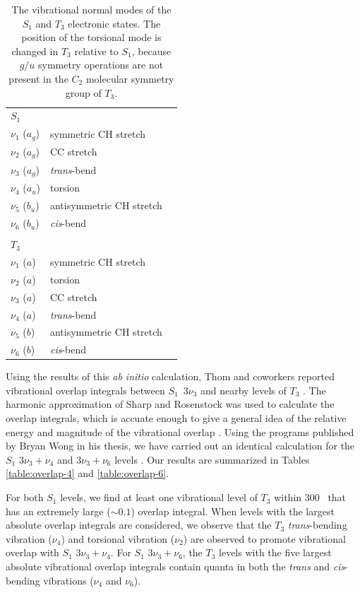 \documentclass[12pt]{mitthesis}
\begin{document}
\begin{table}
  \caption{The vibrational normal modes of the $S_1$ and $T_3$
    electronic states. The
    position of the torsional mode is changed in $T_3$ relative to
    $S_1$, because $g/u$ symmetry operations are not present in the 
    $C_2$ molecular symmetry group of $T_3$.
  }
  \label{table:vibration-ids}
  \centering
  \vspace{5mm}
  \begin{tabular}{llc}
    \toprule
    $S_1$\\
    $\nu_1$ ($a_g$) & symmetric CH stretch \\
    $\nu_2$ ($a_g$) & CC stretch \\
    $\nu_3$ ($a_g$) & \emph{trans}-bend \\
    $\nu_4$ ($a_u$) & torsion \\
    $\nu_5$ ($b_u$) & antisymmetric CH stretch \\
    $\nu_6$ ($b_u$) & \emph{cis}-bend \\
    \\
    $T_3$\\
    $\nu_1$ ($a$) & symmetric CH stretch \\
    $\nu_2$ ($a$) & torsion \\
    $\nu_3$ ($a$) & CC stretch \\
    $\nu_4$ ($a$) & \emph{trans}-bend \\
    $\nu_5$ ($b$) & antisymmetric CH stretch \\
    $\nu_6$ ($b$) & \emph{cis}-bend \\
    \bottomrule
  \end{tabular}
\end{table}

Using the results of this \emph{ab initio} calculation, Thom and
coworkers reported vibrational overlap integrals between $S_1 \:\;
3\nu_3$ and nearby levels of $T_3$ \cite{thom07}.  The harmonic
approximation of Sharp and Rosenstock was used to calculate the
overlap integrals, which is accuate enough to give a general idea of
the relative energy and magnitude of the vibrational overlap
\cite{sharp64}.  Using the programs published by Bryan Wong in his
thesis, we have carried out an identical calculation for the $S_1$
$3\nu_3+\nu_4$ and $3\nu_3+\nu_6$ levels \cite{wong07}.  Our results
are summarized in Tables \ref{table:overlap-4} and
\ref{table:overlap-6}.

For both $S_1$ levels, we find at least one vibrational level of $T_3$
within 300 \rcm\ that has an extremely large ($\sim 0.1$) overlap
integral.  When levels with the largest absolute overlap integrals
are considered, we observe that the $T_3$ \emph{trans}-bending
vibration ($\nu_4$) and torsional vibration ($\nu_2$) are observed to
promote vibrational overlap with $S_1$ $3\nu_3+\nu_4$.  For $S_1$
$3\nu_3+\nu_6$, the $T_3$ levels with the five largest absolute
vibrational overlap integrals contain quanta in both the \emph{trans}
and \emph{cis}-bending vibrations ($\nu_4$ and $\nu_6$).
\end{document}
